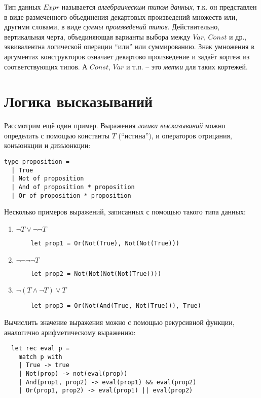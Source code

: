 \documentclass[a4paper,11pt]{article}
\begin{document}
Тип данных $Expr$ называется \emph{алгебраическим типом данных}, т.к. он
представлен в виде размеченного объединения декартовых произведений множеств
или, другими словами, в виде \emph{суммы произведений типов}. Действительно,
вертикальная черта, объединяющая варианты выбора между $Var$, $Const$ и др.,
эквивалентна логической операции ``или'' или суммированию. Знак умножения
в аргументах конструкторов означает декартово произведение и задаёт кортеж из
соответствующих типов. А $Const$, $Var$ и т.п. -- это \emph{метки} для таких 
кортежей.
\section{Логика высказываний}
Рассмотрим ещё один пример. Выражения \emph{логики высказываний} можно 
определить с помощью константы $T$ (``истина''), и операторов отрицания,
конъюнкции и дизъюнкции:

\begin{lstlisting}
type proposition = 
  | True
  | Not of proposition
  | And of proposition * proposition
  | Or of proposition * proposition
\end{lstlisting}

Несколько примеров выражений, записанных с помощью такого типа данных:
\begin{enumerate}
\item $\lnot T \lor \lnot \lnot T$
  \begin{lstlisting}
    let prop1 = Or(Not(True), Not(Not(True)))
  \end{lstlisting}
\item $\lnot \lnot \lnot \lnot T$
  \begin{lstlisting}
    let prop2 = Not(Not(Not(Not(True))))
  \end{lstlisting}
\item $\lnot (T \land \lnot T) \lor T$
  \begin{lstlisting}
    let prop3 = Or(Not(And(True, Not(True))), True)
  \end{lstlisting}
\end{enumerate}

Вычислить значение выражения можно с помощью рекурсивной функции, аналогично
арифметическому выражению:
\begin{lstlisting}
  let rec eval p =
    match p with
    | True -> true
    | Not(prop) -> not(eval(prop))
    | And(prop1, prop2) -> eval(prop1) && eval(prop2)
    | Or(prop1, prop2) -> eval(prop1) || eval(prop2)
\end{lstlisting}
\end{document}
